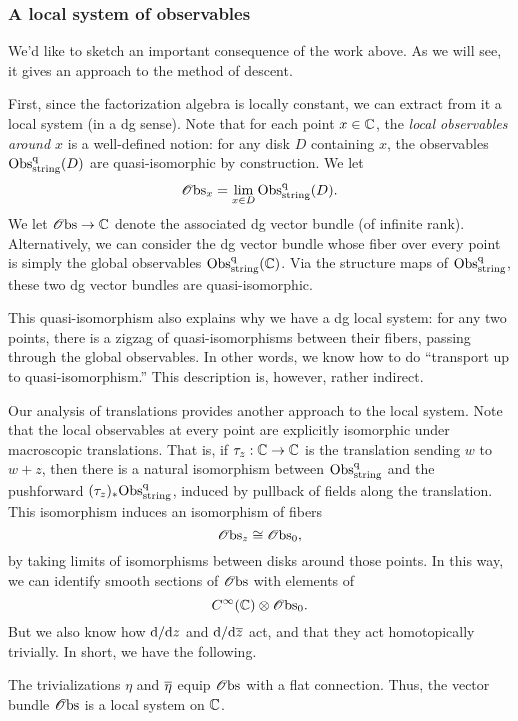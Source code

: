 \subsubsection{A local system of observables}

We'd like to sketch an important consequence of the work above.
As we will see, it gives an approach to the method of descent.

First, since the factorization algebra is locally constant, 
we can extract from it a local system (in a dg sense).
Note that for each point $x \in \CC$,
the {\em local observables around $x$} is a well-defined notion:
for any disk $D$ containing $x$, the observables $\Obs^\q_{\rm string} (D)$ are quasi-isomorphic by construction.
We let 
\[
\sO{\rm bs}_x = \lim_{x \in D} \Obs^\q_{\rm string} (D).
\]
We let $\sO{\rm bs} \to \CC$ denote the associated dg vector bundle (of infinite rank). 
Alternatively, we can consider the dg vector bundle whose fiber over every point is simply the global observables $\Obs^\q_{\rm string} (\CC)$.
Via the structure maps of $\Obs^\q_{\rm string}$, 
these two dg vector bundles are quasi-isomorphic.

This quasi-isomorphism also explains why we have a dg local system:
for any two points, there is a zigzag of quasi-isomorphisms between their fibers,
passing through the global observables.
In other words, we know how to do ``transport up to quasi-isomorphism.''
This description is, however, rather indirect.

Our analysis of translations provides another approach to the local system.
Note that the local observables at every point are explicitly isomorphic under macroscopic translations.
That is, if $\tau_z: \CC \to \CC$ is the translation sending $w$ to $w+z$,
then there is a natural isomorphism between $\Obs^\q_{\rm string}$ and the pushforward $(\tau_z)_* \Obs^\q_{\rm string}$,
induced by pullback of fields along the translation.
This isomorphism induces an isomorphism of fibers
\[
\sO{\rm bs}_z \cong \sO{\rm bs}_0,
\]
by taking limits of isomorphisms between disks around those points.
In this way, we can identify smooth sections of $\sO{\rm bs}$ with elements of
\[
C^\infty(\CC) \otimes \sO{\rm bs}_0.
\]
But we also know how $\d/\d z$ and $\d/\d\zbar$ act, and that they act homotopically trivially.
In short, we have the following.

\begin{cor} 
The trivializations $\eta$ and $\Bar{\eta}$ equip $\sO{\rm bs}$ with a flat connection. 
Thus, the vector bundle $\sO{\rm bs}$ is a local system on $\CC$.
\end{cor}

